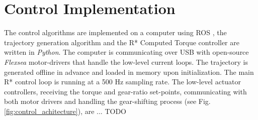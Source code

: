





\section{Control Implementation}
\label{sec:ControlSoftwareArchitecture}

The control algorithms are implemented on a computer using ROS \cite{quigley_ros:_2009}, the trajectory generation algorithm and the R* Computed Torque controller are written in \textit{Python}. The computer is communicating over USB with open-source \textit{Flexsea} motor-drivers \cite{duval_flexsea-execute:_2016} that handle the low-level current loops. The trajectory is generated offline in advance and loaded in memory upon initialization. The main R* control loop is running at a 500 Hz sampling rate. The low-level actuator controllers, receiving the torque and gear-ratio set-points, communicating with both motor drivers and handling the gear-shifting process (see Fig. \ref{fig:control_achitecture}), are ... TODO


